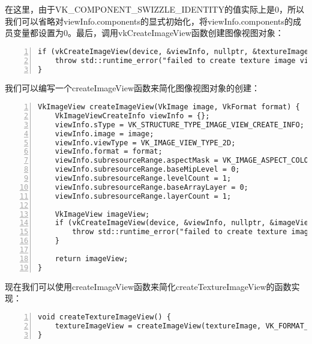 \documentclass{ctexart}
\begin{document}
在这里，由于VK\_COMPONENT\_SWIZZLE\_IDENTITY的值实际上是0，所以我们可以省略对viewInfo.components的显式初始化，将viewInfo.components的成员变量都设置为0。最后，调用vkCreateImageView函数创建图像视图对象：

\begin{lstlisting}[language={[ANSI]C},keywordstyle=\color{blue!70},commentstyle=\color{red!50!green!50!blue!50},frame=shadowbox, rulesepcolor=\color{red!20!green!20!blue!20},basicstyle=\small,numbers=left, numberstyle=\tiny,breaklines=true]
if (vkCreateImageView(device, &viewInfo, nullptr, &textureImageView) != VK_SUCCESS) {
	throw std::runtime_error("failed to create texture image view!");
}
\end{lstlisting}

我们可以编写一个createImageView函数来简化图像视图对象的创建：

\begin{lstlisting}[language={[ANSI]C},keywordstyle=\color{blue!70},commentstyle=\color{red!50!green!50!blue!50},frame=shadowbox, rulesepcolor=\color{red!20!green!20!blue!20},basicstyle=\small,numbers=left, numberstyle=\tiny,breaklines=true]
VkImageView createImageView(VkImage image, VkFormat format) {
	VkImageViewCreateInfo viewInfo = {};
	viewInfo.sType = VK_STRUCTURE_TYPE_IMAGE_VIEW_CREATE_INFO;
	viewInfo.image = image;
	viewInfo.viewType = VK_IMAGE_VIEW_TYPE_2D;
	viewInfo.format = format;
	viewInfo.subresourceRange.aspectMask = VK_IMAGE_ASPECT_COLOR_BIT;
	viewInfo.subresourceRange.baseMipLevel = 0;
	viewInfo.subresourceRange.levelCount = 1;
	viewInfo.subresourceRange.baseArrayLayer = 0;
	viewInfo.subresourceRange.layerCount = 1;

	VkImageView imageView;
	if (vkCreateImageView(device, &viewInfo, nullptr, &imageView) != VK_SUCCESS) {
		throw std::runtime_error("failed to create texture image view!");
	}

	return imageView;
}
\end{lstlisting}

现在我们可以使用createImageView函数来简化createTextureImageView的函数实现：

\begin{lstlisting}[language={[ANSI]C},keywordstyle=\color{blue!70},commentstyle=\color{red!50!green!50!blue!50},frame=shadowbox, rulesepcolor=\color{red!20!green!20!blue!20},basicstyle=\small,numbers=left, numberstyle=\tiny,breaklines=true]
void createTextureImageView() {
	textureImageView = createImageView(textureImage, VK_FORMAT_R8G8B8A8_UNORM);
}
\end{lstlisting}
\end{document}
